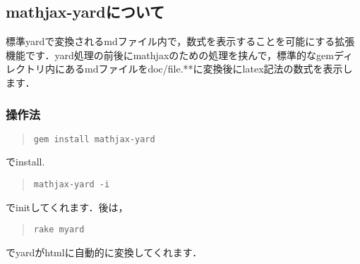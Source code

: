 \documentclass[10pt,a4j,twocolumn]{jsarticle}
\begin{document}
\subsection{mathjax-yardについて}
標準yardで変換されるmdファイル内で，数式を表示することを可能にする拡張機能です．yard処理の前後にmathjaxのための処理を挟んで，標準的なgemディレクトリ内にあるmdファイルをdoc/file.**に変換後にlatex記法の数式を表示します．

\subsubsection{操作法}\begin{quote}\begin{verbatim}
gem install mathjax-yard
\end{verbatim}\end{quote}
でinstall.
\begin{quote}\begin{verbatim}
mathjax-yard -i
\end{verbatim}\end{quote}
でinitしてくれます．後は，　
\begin{quote}\begin{verbatim}
rake myard
\end{verbatim}\end{quote}
でyardがhtmlに自動的に変換してくれます．
\end{document}
